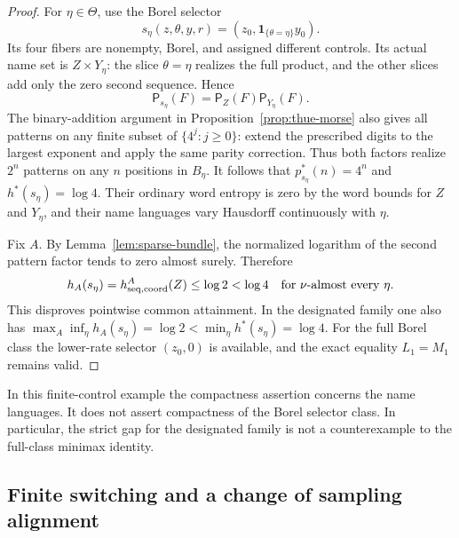\documentclass[11pt,reqno]{amsart}
\numberwithin{equation}{section}
\theoremstyle{definition}
\newcommand{\Patt}{\mathsf P}
\newcommand{\one}{\mathbf 1}
\begin{document}
\begin{proof}
For $\eta\in\Theta$, use the Borel selector
\[
 s_\eta(z,\theta,y,r)=(z_0,\one_{\{\theta=\eta\}}y_0).
\]
Its four fibers are nonempty, Borel, and assigned different
controls. Its actual name set is $Z\times Y_\eta$:
the slice $\theta=\eta$ realizes the full product, and the
other slices add only the zero second sequence. Hence
\[
 \Patt_{s_\eta}(F)=\Patt_Z(F)\Patt_{Y_\eta}(F).
\]
The binary-addition argument in Proposition~\ref{prop:thue-morse}
also gives all patterns on any finite subset of
$\{4^j:j\ge0\}$: extend the prescribed digits to the largest
exponent and apply the same parity correction. Thus both factors
realize $2^n$ patterns on any $n$ positions in $B_\eta$.
It follows that $p_{s_\eta}^*(n)=4^n$ and $h^*(s_\eta)=\log4$.
Their ordinary word entropy is zero by the word bounds for
$Z$ and $Y_\eta$, and their name languages vary Hausdorff
continuously with $\eta$.

Fix $A$. By Lemma~\ref{lem:sparse-bundle}, the normalized
logarithm of the second pattern factor tends to zero almost
surely. Therefore
\[
 h_A(s_\eta)=h_{\rm seq,coord}^A(Z)\le\log2<\log4
 \quad\text{for }\nu\text{-almost every }\eta.
\]
This disproves pointwise common attainment. In the designated
family one also has
$\max_A\inf_\eta h_A(s_\eta)=\log2<\min_\eta h^*(s_\eta)=\log4$.
For the full Borel class the lower-rate selector $(z_0,0)$
is available, and the exact equality $L_1=M_1$ remains valid.
\end{proof}

In this finite-control example the compactness assertion concerns
the name languages. It does not assert compactness of the Borel
selector class. In particular, the strict gap for the designated
family is not a counterexample to the full-class minimax identity.


\subsection{Finite switching and a change of sampling alignment}
\end{document}
